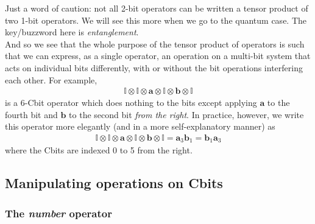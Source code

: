 \documentclass{book}
\theoremstyle{definition}
\begin{document}
Just a word of caution: not all 2-bit operators can be written a tensor product of two 1-bit operators. We will see this more when we go to the quantum case. The key/buzzword here is \textit{entanglement}. \\

And so we see that the whole purpose of the tensor product of operators is such that we can express, as a single operator, an operation on a multi-bit system that acts on individual bits differently, with or without the bit operations interfering each other. For example, 
\begin{align}
\mathbb{I}\otimes\mathbb{I}\otimes\mathbf{a}\otimes\mathbb{I}\otimes\mathbf{b}\otimes\mathbb{I}
\end{align}
is a 6-Cbit operator which does nothing to the bits except applying $\mathbf{a}$ to the fourth bit and $\mathbf{b}$ to the second bit \textit{from the right}. In practice, however, we write this operator more elegantly (and in a more self-explanatory manner) as
\begin{align}
\mathbb{I}\otimes\mathbb{I}\otimes\mathbf{a}\otimes\mathbb{I}\otimes\mathbf{b}\otimes\mathbb{I} = \mathbf{a}_3\mathbf{b}_1 = \mathbf{b}_1\mathbf{a}_3
\end{align}
where the Cbits are indexed 0 to 5 from the right. 








\subsection{Manipulating operations on Cbits}

\subsubsection{The \textit{number} operator}
\end{document}
